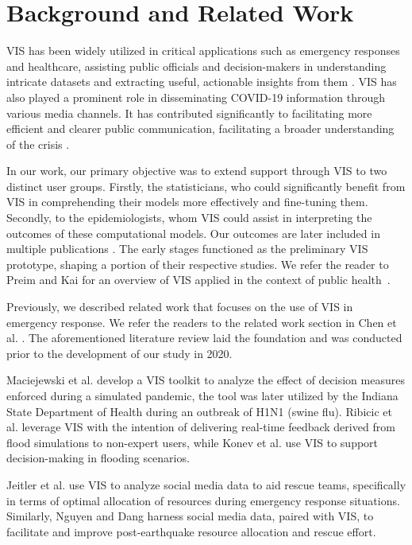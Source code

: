 \section{Background and Related Work}

\ac{VIS} has been widely utilized in critical applications such as emergency responses and healthcare, assisting public officials and decision-makers in understanding intricate datasets and extracting useful, actionable insights from them \cite{dusse2016Information}. 
\ac{VIS} has also played a prominent role in disseminating COVID-19 information through various media channels. It has contributed significantly to facilitating more efficient and clearer public communication, facilitating a broader understanding of the crisis \cite{johnshopkinsuniversityCOVID19}.

In our work, our primary objective was to extend support through \ac{VIS} to two distinct user groups.
Firstly, the statisticians, who could significantly benefit from VIS in comprehending their models more effectively and fine-tuning them.
Secondly, to the epidemiologists, whom VIS could assist in interpreting the outcomes of these computational models. Our outcomes are later included in multiple publications \cite{chen2022RAMPVIS,dykes2022Visualizationb,khan2022Propagating,khan2022Rapid}. The early stages functioned as the preliminary VIS prototype, shaping a portion of their respective studies.
We refer the reader to Preim and Kai for an overview of VIS applied in the context of public health~\cite{preim:survey}.

Previously, we described related work that focuses on the use of \ac{VIS} in emergency response. We refer the readers to the related work section in Chen et al. \cite{chen2022RAMPVIS}. The aforementioned literature review laid the foundation and was conducted prior to the development of our study in 2020.

Maciejewski et al. \cite{maciejewski2011Pandemica} develop a VIS toolkit to analyze the effect of decision measures enforced during a simulated pandemic, the tool was later utilized by the Indiana State Department of Health during an outbreak of H1N1 (swine flu).
Ribicic et al. \cite{ribicic2012Sketching} leverage VIS with the intention of delivering real-time feedback derived from flood simulations to non-expert users, while Konev et al. \cite{konev2014Run} use VIS to support decision-making in flooding scenarios.

Jeitler et al. \cite{jeitler2019RescueMark} use VIS to analyze social media data to aid rescue teams, specifically in terms of optimal allocation of resources during emergency response situations.
Similarly, Nguyen and Dang \cite{nguyen2019EQSA} harness social media data, paired with VIS, to facilitate and improve post-earthquake resource allocation and rescue effort.

